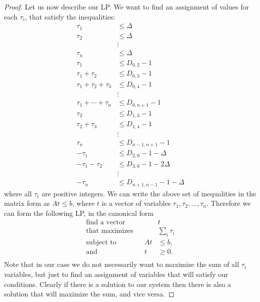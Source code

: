 \documentclass[a4paper,UKenglish,cleveref, autoref, thm-restate]{lipics-v2021}
\begin{document}
\begin{proof}
Let us now describe our LP.
We want to find an assignment of values for each $\tau_i$, that satisfy the inequalities:
\begin{equation} \label{eq:paths-inequalities-A}
\begin{aligned}
\tau_1 & \leq \Delta \\
\tau_2 & \leq \Delta \\
& \vdots \\
\tau_n &\leq \Delta \\
\tau_1 &\leq D_{0,2} -1 \\
\tau_1 + \tau_2 &\leq D_{0,3} -1 \\
\tau_1 + \tau_2 + \tau_3 &\leq D_{0,4} -1 \\
& \vdots \\
\tau_1 + \cdots + \tau_n &\leq D_{0,n+1} -1 \\
\tau_2 & \leq D_{1,3} -1 \\
\tau_2 + \tau_3 &\leq D_{1,4} - 1\\
& \vdots \\
\tau_n &\leq D_{n-1,n+1} - 1 \\
- \tau_1 &\leq D_{2,0} -1 - \Delta \\
- \tau_1 - \tau_2 &\leq D_{3,0} -1 -2 \Delta \\
& \vdots \\
- \tau_n &\leq D_{n+1,n-1} - 1 - \Delta
\end{aligned}
\end{equation}
where all $\tau_i$ are positive integers.
We can write the above set of inequalities in the matrix form as $A t \leq b$, where $t$ is a vector of variables $\tau_1,\tau_2,\dots, \tau_n$.
Therefore we can form the following LP, in the canonical form
\begin{equation} \label{eq:paths-LP}
\begin{aligned}
\text{find a vector} &&& t \\
\text{that maximizes} &&& \sum_i \tau_i \\
\text{subject to} && A t  &\leq b, \\
\text{and} && t &\geq 0. \\
\end{aligned}
\end{equation}
Note that in our case we do not necessarily want to maximize the sum of all $\tau_i$ variables, but just to find an assignment of variables that will satisfy our conditions. Clearly if there is a solution to our system then there is also a solution that will maximize the sum, and vice versa. 


\end{proof}
\end{document}
